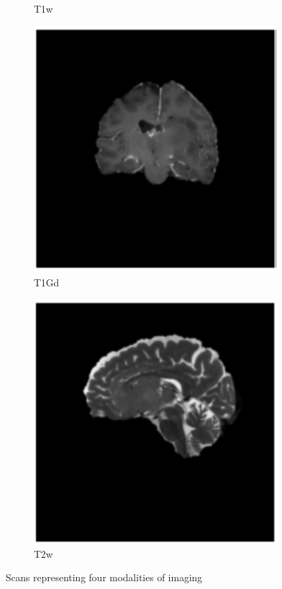 \documentclass[a4paper,12pt]{extarticle}
\begin{document}
\begin{figure}[H]
\begin{subfigure}[b]{0.24\linewidth}
        \caption{T1w}
        \label{fig:img2}
    \end{subfigure}
    \begin{subfigure}[b]{0.24\linewidth}
        \includegraphics[width=\linewidth]{figure/t1gd.png}
        \caption{T1Gd}
        \label{fig:img3}
    \end{subfigure}
    \begin{subfigure}[b]{0.24\linewidth}
        \includegraphics[width=\linewidth]{figure/t2w.png}
        \caption{T2w}
        \label{fig:img4}
    \end{subfigure}
    \caption{Scans representing four modalities of imaging}
    \label{fig:four_modalities}
\end{figure}
\end{document}
